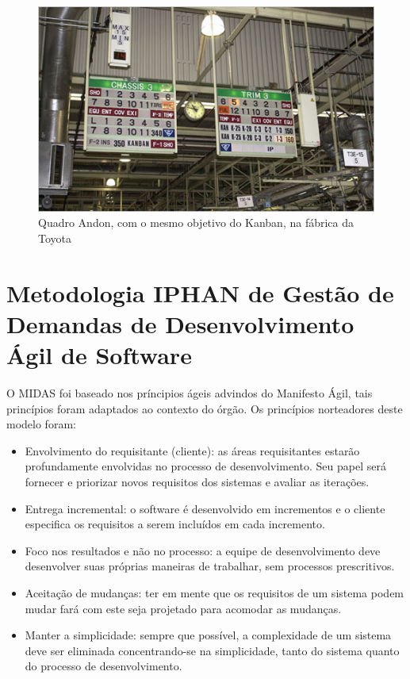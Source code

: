 \begin{anexosenv}
\begin{figure}[H]
		\centering
		\label{fig04}
			\includegraphics[scale=1.0]{figuras/kanbanindustria.png}
		\caption{Quadro Andon, com o mesmo objetivo do Kanban, na fábrica da Toyota \cite{kanbanindustria}}
\end{figure}

\chapter{Metodologia IPHAN de Gestão de Demandas de Desenvolvimento Ágil de Software}

O MIDAS foi baseado nos príncipios ágeis advindos do Manifesto Ágil, tais princípios foram adaptados ao contexto do órgão. Os princípios norteadores deste modelo foram:
\begin{itemize}
\item Envolvimento do requisitante (cliente): as áreas requisitantes estarão profundamente envolvidas no processo de desenvolvimento. Seu papel será fornecer e priorizar novos requisitos dos sistemas e avaliar as iterações.
\item Entrega incremental: o software é desenvolvido em incrementos e o cliente especifica os requisitos a serem incluídos em cada incremento.
\item Foco nos resultados e não no processo: a equipe de desenvolvimento deve desenvolver suas próprias maneiras de trabalhar, sem processos prescritivos.
\item Aceitação de mudanças: ter em mente que os requisitos de um sistema podem mudar fará com este seja projetado para acomodar as mudanças.
\item Manter a simplicidade: sempre que possível, a complexidade de um sistema deve ser eliminada concentrando-se na simplicidade, tanto do sistema quanto do processo de desenvolvimento.
\end{itemize}


\end{anexosenv}
